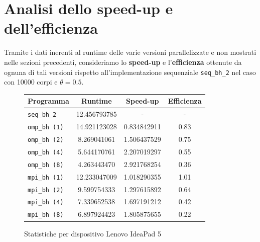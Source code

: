 \documentclass[12pt]{report}
\begin{document}
    \newpage

    \section{Analisi dello speed-up e dell'efficienza}

    Tramite i dati inerenti al runtime delle varie versioni parallelizzate e non mostrati nelle sezioni precedenti, consideriamo lo \textbf{speed-up} e l'\textbf{efficienza} ottenute da ognuna di tali versioni rispetto all'implementazione sequenziale \texttt{seq\_bh\_2} nel caso con 10000 corpi e $\theta = 0.5$.

    \begin{figure}[H]
        \centering

        \begin{tabular}{ l | c | c | c }
            \textbf{Programma} & \textbf{Runtime} & \textbf{Speed-up} & \textbf{Efficienza}\\
            \hline
            \texttt{seq\_bh\_2} & 12.456793785 & - & - \\
            \hline
            \texttt{omp\_bh (1)} & 14.921123028 & 0.834842911 & 0.83 \\
            \texttt{omp\_bh (2)} & 8.269041061 & 1.506437529 & 0.75 \\
            \texttt{omp\_bh (4)} & 5.644170761 & 2.207019297 & 0.55 \\
            \texttt{omp\_bh (8)} & 4.263443470 & 2.921768254 & 0.36 \\
            \hline
            \texttt{mpi\_bh (1)} & 12.233047009 & 1.018290355 & 1.01 \\
            \texttt{mpi\_bh (2)} & 9.599754333 & 1.297615892 & 0.64 \\
            \texttt{mpi\_bh (4)} & 7.339652538 & 1.697191212 & 0.42 \\
            \texttt{mpi\_bh (8)} & 6.897924423 & 1.805875655 & 0.22 \\
        \end{tabular}
        \caption{Statistiche per dispositivo Lenovo IdeaPad 5}
        \label{fig:stats_ip5_2}
    \end{figure}
\end{document}
